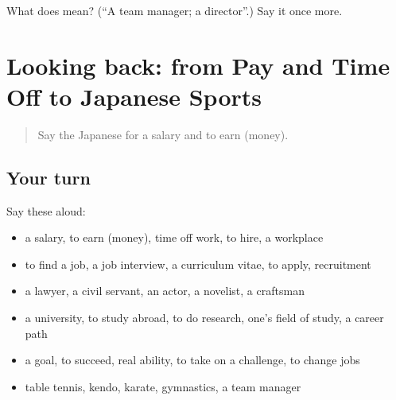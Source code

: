 \begin{tcolorbox}[breakable,colback=teal!4,colframe=teal!35!black,title={Before you move on}]
What does  mean? (\textquotedblleft{}A team manager; a director\textquotedblright{}.) Say it once more.
\end{tcolorbox}
\section[(dialogue)]{Looking back: from Pay and Time Off to Japanese Sports}

\label{lesson:JA-R461-review-456-461}



\begin{quote}
Say the Japanese for a salary and to earn (money).
\end{quote}

\subsection*{Your turn}
Say these aloud:

\begin{itemize}
\raggedright
  \item a salary, to earn (money), time off work, to hire, a workplace
  \item to find a job, a job interview, a curriculum vitae, to apply, recruitment
  \item a lawyer, a civil servant, an actor, a novelist, a craftsman
  \item a university, to study abroad, to do research, one's field of study, a career path
  \item a goal, to succeed, real ability, to take on a challenge, to change jobs
  \item table tennis, kendo, karate, gymnastics, a team manager
\end{itemize}

